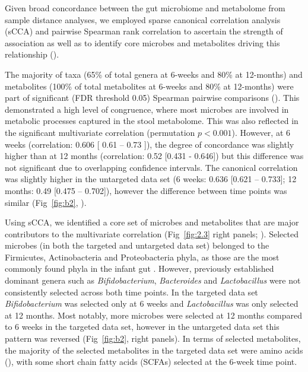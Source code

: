 Given broad concordance between the gut microbiome and metabolome from sample distance analyses, we employed sparse canonical correlation analysis (sCCA) and pairwise Spearman rank correlation to ascertain the strength of association as well as to identify core microbes and metabolites driving this relationship ().   

The majority of taxa (65\% of total genera at 6-weeks and 80\% at 12-months) and metabolites (100\% of total metabolites at 6-weeks and 80\% at 12-months) were part of significant (FDR threshold 0.05) Spearman pairwise comparisons (). This demonstrated a high level of congruence, where most microbes are involved in metabolic processes captured in the stool metabolome. This was also reflected in the significant multivariate correlation (permutation $p < 0.001$). However, at 6 weeks (correlation: 0.606 [ 0.61 -- 0.73 ]), the degree of concordance was slightly higher than at 12 months (correlation: 0.52 [0.431 - 0.646]) but this difference was not significant due to overlapping confidence intervals. The canonical correlation was slightly higher in the untargeted data set (6 weeks: 0.636 [0.621 – 0.733]; 12 months: 0.49 [0.475 – 0.702]), however the difference between time points was similar (Fig~\ref{fig:b2}, ). 

Using sCCA, we identified a core set of microbes and metabolites that are major contributors to the multivariate correlation (Fig~\ref{fig:2.3} right panels; ). Selected microbes (in both the targeted and untargeted data set) belonged to the Firmicutes, Actinobacteria and Proteobacteria phyla, as those are the most commonly found phyla in the infant gut \cite{madan2016effects, backhed2015dynamics}. However, previously established dominant genera such as \emph{Bifidobacterium}, \emph{Bacteroides} and \emph{Lactobacillus} were not consistently selected across both time points. In the targeted data set \emph{Bifidobacterium} was selected only at 6 weeks and \emph{Lactobacillus} was only selected at 12 months. Most notably, more microbes were selected at 12 months compared to 6 weeks in the targeted data set, however in the untargeted data set this pattern was reversed (Fig~\ref{fig:b2}, right panels). In terms of selected metabolites, the majority of the selected metabolites in the targeted data set were amino acids (), with some short chain fatty acids (SCFAs) selected at the 6-week time point.  

